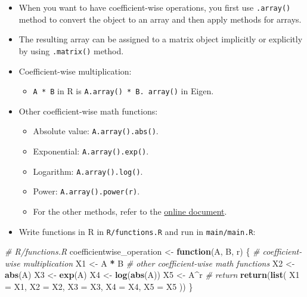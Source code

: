 \documentclass[
]{book}
\newenvironment{Shaded}{\begin{snugshade}}{\end{snugshade}}
\newcommand{\CommentTok}[1]{\textcolor[rgb]{0.56,0.35,0.01}{\textit{#1}}}
\newcommand{\ControlFlowTok}[1]{\textcolor[rgb]{0.13,0.29,0.53}{\textbf{#1}}}
\newcommand{\DataTypeTok}[1]{\textcolor[rgb]{0.13,0.29,0.53}{#1}}
\newcommand{\KeywordTok}[1]{\textcolor[rgb]{0.13,0.29,0.53}{\textbf{#1}}}
\newcommand{\NormalTok}[1]{#1}
\newcommand{\OperatorTok}[1]{\textcolor[rgb]{0.81,0.36,0.00}{\textbf{#1}}}
\newcommand{\StringTok}[1]{\textcolor[rgb]{0.31,0.60,0.02}{#1}}
\providecommand{\tightlist}{%
  \setlength{\itemsep}{0pt}\setlength{\parskip}{0pt}}
\begin{document}
\begin{itemize}
\item
  When you want to have coefficient-wise operations, you first use \texttt{.array()} method to convert the object to an array and then apply methods for arrays.
\item
  The resulting array can be assigned to a matrix object implicitly or explicitly by using \texttt{.matrix()} method.
\item
  Coefficient-wise multiplication:

  \begin{itemize}
  \tightlist
  \item
    \texttt{A\ *\ B} in R is \texttt{A.array()\ *\ B.\ array()} in Eigen.
  \end{itemize}
\item
  Other coefficient-wise math functions:

  \begin{itemize}
  \tightlist
  \item
    Absolute value: \texttt{A.array().abs()}.
  \item
    Exponential: \texttt{A.array().exp()}.
  \item
    Logarithm: \texttt{A.array().log()}.
  \item
    Power: \texttt{A.array().power(r)}.
  \item
    For the other methods, refer to the \href{https://eigen.tuxfamily.org/dox/group__CoeffwiseMathFunctions.html}{online document}.
  \end{itemize}
\item
  Write functions in R in \texttt{R/functions.R} and run in \texttt{main/main.R}:
\end{itemize}

\begin{Shaded}
\begin{Highlighting}[]
\CommentTok{# R/functions.R}
\NormalTok{coefficientwise_operation <-}
\StringTok{  }\ControlFlowTok{function}\NormalTok{(A, B, r) \{}
    \CommentTok{# coefficient-wise multiplication}
\NormalTok{    X1 <-}\StringTok{ }\NormalTok{A }\OperatorTok{*}\StringTok{ }\NormalTok{B}
    \CommentTok{# other coefficient-wise math functions}
\NormalTok{    X2 <-}\StringTok{ }\KeywordTok{abs}\NormalTok{(A)}
\NormalTok{    X3 <-}\StringTok{ }\KeywordTok{exp}\NormalTok{(A)}
\NormalTok{    X4 <-}\StringTok{ }\KeywordTok{log}\NormalTok{(}\KeywordTok{abs}\NormalTok{(A))}
\NormalTok{    X5 <-}\StringTok{ }\NormalTok{A}\OperatorTok{^}\NormalTok{r}
    \CommentTok{# return}
    \KeywordTok{return}\NormalTok{(}\KeywordTok{list}\NormalTok{(}
      \DataTypeTok{X1 =}\NormalTok{ X1,}
      \DataTypeTok{X2 =}\NormalTok{ X2,}
      \DataTypeTok{X3 =}\NormalTok{ X3,}
      \DataTypeTok{X4 =}\NormalTok{ X4,}
      \DataTypeTok{X5 =}\NormalTok{ X5}
\NormalTok{    ))}
\NormalTok{  \}}
\end{Highlighting}
\end{Shaded}
\end{document}
